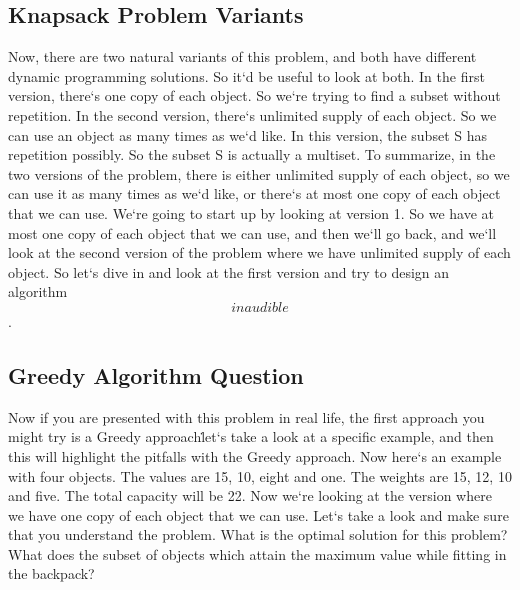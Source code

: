 \subsection{Knapsack Problem Variants}
Now, there are two natural variants of this problem, and both have different dynamic programming solutions.
So it`d be useful to look at both.
In the first version, there`s one copy of each object.
So we`re trying to find a subset without repetition.
In the second version, there`s unlimited supply of each object.
So we can use an object as many times as we`d like.
In this version, the subset S has repetition possibly.
So the subset S is actually a multiset.
To summarize, in the two versions of the problem, there is either unlimited supply of each object, so we can use it as many times as we`d like, or there`s at most one copy of each object that we can use.
We`re going to start up by looking at version 1.
So we have at most one copy of each object that we can use, and then we`ll go back, and we`ll look at the second version of the problem where we have unlimited supply of each object.
So let`s dive in and look at the first version and try to design an algorithm \[inaudible\].

\subsection{Greedy Algorithm  Question}
Now if you are presented with this problem in real life, the first approach you might try is a Greedy approach\. let`s take a look at a specific example, and then this will highlight the pitfalls with the Greedy approach.
Now here`s an example with four objects.
The values are 15, 10, eight and one.
The weights are 15, 12, 10 and five.
The total capacity will be 22.
Now we`re looking at the version where we have one copy of each object that we can use.
Let`s take a look and make sure that you understand the problem.
What is the optimal solution for this problem? What does the subset of objects which attain the maximum value while fitting in the backpack?

